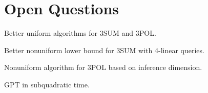 \section{Open Questions}

Better uniform algorithms for 3SUM and 3POL.

Better nonuniform lower bound for 3SUM with 4-linear queries.

Nonuniform algorithm for 3POL based on inference dimension.

GPT in subquadratic time.
